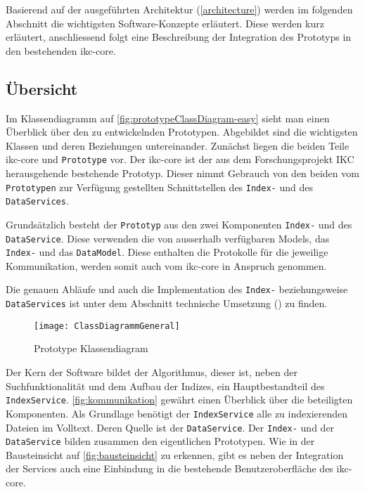 Basierend auf der ausgeführten Architektur (\autoref{architecture}) werden im folgenden Abschnitt die wichtigsten Software-Konzepte erläutert. Diese werden kurz erläutert, anschliessend folgt eine Beschreibung der Integration des Prototyps in den bestehenden \gls{ikc-core}.


\subsection{Übersicht}



Im Klassendiagramm auf \autoref{fig:prototypeClassDiagram-easy} sieht man einen Überblick über den zu entwickelnden Prototypen. Abgebildet sind die wichtigsten Klassen und deren Beziehungen untereinander. Zunächst liegen die beiden Teile \gls{ikc-core} und \texttt{Prototype} vor. Der \gls{ikc-core} ist der aus dem Forschungsprojekt \gls{IKC} herausgehende bestehende Prototyp. Dieser nimmt Gebrauch von den beiden vom \texttt{Prototypen} zur Verfügung gestellten Schnittstellen des \texttt{Index-} und des \texttt{DataServices}.

Grundsätzlich besteht der \texttt{Prototyp} aus den zwei Komponenten \texttt{Index-} und des \texttt{DataService}. Diese verwenden die von ausserhalb ver\-füg\-bar\-en Models, das \texttt{In\-dex-} und das \texttt{DataModel}. Diese enthalten die Protokolle für die jeweilige Kommunikation, werden somit auch vom \gls{ikc-core} in Anspruch genommen.

Die genauen Abläufe und auch die Implementation des \texttt{Index-} beziehungsweise \texttt{DataServices} ist unter dem Abschnitt technische Umsetzung () zu finden.

    \begin{figure}[H]
    \centering
    \texttt{[image: ClassDiagrammGeneral]}
    \caption{Prototype Klassendiagram}
    \label{fig:prototypeClassDiagram-easy}
    \end{figure}

Der Kern der Software bildet der Algorithmus, dieser ist, neben der Suchfunktionalität und dem Aufbau der Indizes, ein Hauptbestandteil des \texttt{IndexService}. \autoref{fig:kommunikation} gewährt einen Überblick über die beteiligten Komponenten. Als Grundlage benötigt der \texttt{In\-dex\-Ser\-vice} alle zu indexierenden Dateien im Volltext. Deren Quelle ist der \texttt{Data\-Ser\-vice}. Der \texttt{Index-} und der \texttt{DataService} bilden zusammen den eigentlichen Prototypen. Wie in der Bausteinsicht auf \autoref{fig:bausteinsicht} zu erkennen, gibt es neben der Integration der Services auch eine Einbindung in die bestehende Benutzeroberfläche des \gls{ikc-core}.


